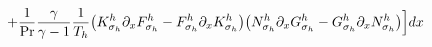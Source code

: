 \documentclass[preview]{standalone}
\newcommand{\dx}{\partial_x}
\begin{document}
\begin{align*}
\special{dvisvgm:raw <g id='unique000'>}\qquad+\frac{1}{\mathrm{Pr}}\frac{\gamma}{\gamma-1}\frac{1}{T_h}\big(K^h_{\sigma_h}\dx F^h_{\sigma_h}-F^h_{\sigma_h}\dx K^h_{\sigma_h}\big)\big(N^h_{\sigma_h}\dx G^h_{\sigma_h}-G^h_{\sigma_h}\dx N^h_{\sigma_h}\big)\Big]dx\special{dvisvgm:raw </g>}
\end{align*}
\end{document}

